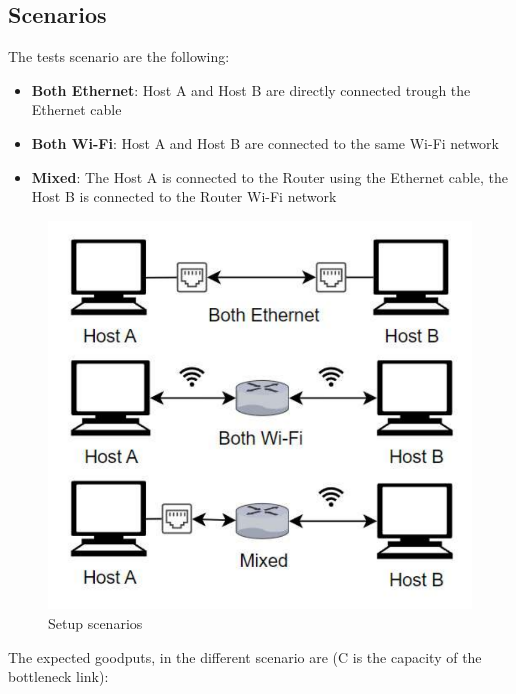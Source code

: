 \subsection{Scenarios}
The tests scenario are the following:
\begin{itemize}
    \item \textbf{Both Ethernet}: Host A and Host B are directly connected trough the Ethernet cable
    \item \textbf{Both Wi-Fi}: Host A and Host B are connected to the same Wi-Fi network
    \item \textbf{Mixed}: The Host A is connected to the Router using the Ethernet cable, the Host B is connected to the Router Wi-Fi network
\end{itemize}

\vspace{-15pt}
\begin{figure}[H]
\includegraphics[scale=0.25]{images/setup_scenarios.pdf}
\vspace{-10pt}
\caption{Setup scenarios}
\label{fig:setup_scenarios}
\end{figure}
The expected goodputs, in the different scenario are (C is the capacity of the bottleneck link): 
